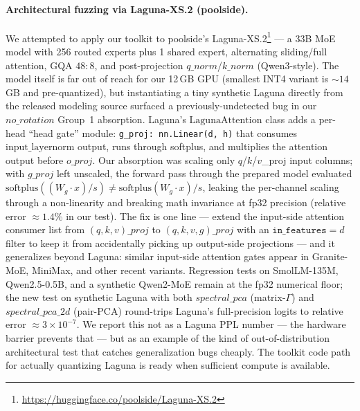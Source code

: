 \documentclass[11pt]{article}
\begin{document}
\paragraph{Architectural fuzzing via Laguna-XS.2 (poolside).}
We attempted to apply our toolkit to poolside's Laguna-XS.2\footnote{\url{https://huggingface.co/poolside/Laguna-XS.2}} --- a 33B MoE model with 256 routed experts plus 1 shared expert, alternating sliding/full attention, GQA $48{:}8$, and post-projection $q\_norm$/$k\_norm$ (Qwen3-style). The model itself is far out of reach for our 12\,GB GPU (smallest INT4 variant is $\sim 14$\,GB and pre-quantized), but instantiating a tiny synthetic Laguna directly from the released modeling source surfaced a previously-undetected bug in our $no\_rotation$ Group~1 absorption. Laguna's $\mathrm{LagunaAttention}$ class adds a per-head ``head gate'' module: \texttt{g\_proj: nn.Linear(d, h)} that consumes $\mathrm{input\_layernorm}$ output, runs through softplus, and multiplies the attention output before $o\_proj$. Our absorption was scaling only $q$/$k$/$v$\_proj input columns; with $g\_proj$ left unscaled, the forward pass through the prepared model evaluated $\mathrm{softplus}((W_g \cdot x)/s) \neq \mathrm{softplus}(W_g \cdot x)/s$, leaking the per-channel scaling through a non-linearity and breaking math invariance at fp32 precision (relative error $\approx 1.4\%$ in our test). The fix is one line --- extend the input-side attention consumer list from $(q,k,v)\_proj$ to $(q,k,v,g)\_proj$ with an $\texttt{in\_features} = d$ filter to keep it from accidentally picking up output-side projections --- and it generalizes beyond Laguna: similar input-side attention gates appear in Granite-MoE, MiniMax, and other recent variants. Regression tests on SmolLM-135M, Qwen2.5-0.5B, and a synthetic Qwen2-MoE remain at the fp32 numerical floor; the new test on synthetic Laguna with both $spectral\_pca$ (matrix-$\Gamma$) and $spectral\_pca\_2d$ (pair-PCA) round-trips Laguna's full-precision logits to relative error $\approx 3 \times 10^{-7}$. We report this not as a Laguna PPL number --- the hardware barrier prevents that --- but as an example of the kind of out-of-distribution architectural test that catches generalization bugs cheaply. The toolkit code path for actually quantizing Laguna is ready when sufficient compute is available.
\end{document}
